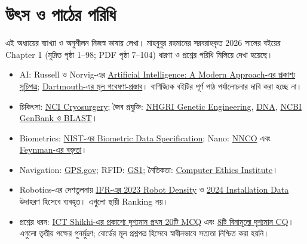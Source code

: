 \section*{উৎস ও পাঠের পরিধি}
এই অধ্যায়ের ব্যাখ্যা ও অনুশীলন নিজস্ব ভাষায় লেখা। মাহবুবুর রহমানের সরবরাহকৃত 2026 সালের বইয়ের Chapter 1 (মুদ্রিত পৃষ্ঠা 1--98; PDF পৃষ্ঠা 7--104) ধারণা ও প্রশ্নের পরিধি মিলিয়ে দেখা হয়েছে।
\begin{itemize}
\item AI: Russell ও Norvig-এর \href{https://aima.cs.berkeley.edu/contents.html}{Artificial Intelligence: A Modern Approach-এর প্রকাশ্য সূচিপত্র}; \href{https://www-formal.stanford.edu/jmc/history/dartmouth/dartmouth.html}{Dartmouth-এর মূল গবেষণা-প্রস্তাব}। বাণিজ্যিক বইটির পূর্ণ পাঠ পর্যালোচনার দাবি করা হচ্ছে না।
\item চিকিৎসা: \href{https://www.cancer.gov/about-cancer/treatment/types/surgery/cryosurgery}{NCI Cryosurgery}; জৈব প্রযুক্তি: \href{https://www.genome.gov/genetics-glossary/Genetic-Engineering}{NHGRI Genetic Engineering}, \href{https://www.genome.gov/about-genomics/fact-sheets/Deoxyribonucleic-Acid-Fact-Sheet}{DNA}, \href{https://www.ncbi.nlm.nih.gov/genbank/genbank/}{NCBI GenBank ও BLAST}।
\item Biometrics: \href{https://nvlpubs.nist.gov/nistpubs/SpecialPublications/NIST.SP.800-76-2.pdf}{NIST-এর Biometric Data Specification}; Nano: \href{https://www.nano.gov/about-nanotechnology/}{NNCO} এবং \href{https://feynman.com/science/nanotechnology/}{Feynman-এর বক্তৃতা}।
\item Navigation: \href{https://www.gps.gov/systems/gps/index.php}{GPS.gov}; RFID: \href{https://www.gs1.org/standards/rfid}{GS1}; নৈতিকতা: \href{https://computerethics.institute/publications/ten-commandments-of-computer-ethics/}{Computer Ethics Institute}।
\item Robotics-এর দেশতুলনায় \href{https://ifr.org/ifr-press-releases/news/global-robot-density-in-factories-doubled-in-seven-years}{IFR-এর 2023 Robot Density} ও \href{https://ifr.org/ifr-press-releases/news/global-robot-demand-in-factories-doubles-over-10-years}{2024 Installation Data} উদাহরণ হিসেবে ব্যবহৃত। এগুলো স্থায়ী Ranking নয়।
\item প্রশ্নের ধরন: \href{https://ictshikhi.com/mcq/hsc/information-and-communication-technology-world-and-bangladesh-perspective}{ICT Shikhi-এর প্রকাশ্যে দৃশ্যমান প্রথম 20টি MCQ} এবং \href{https://ictshikhi.com/cq/hsc/information-and-communication-technology-world-and-bangladesh-perspective}{8টি বিনামূল্যে দৃশ্যমান CQ}। এগুলো তৃতীয় পক্ষের পুনর্মুদ্রণ; বোর্ডের মূল প্রশ্নপত্র হিসেবে স্বাধীনভাবে সত্যতা নিশ্চিত করা হয়নি।
\end{itemize}
